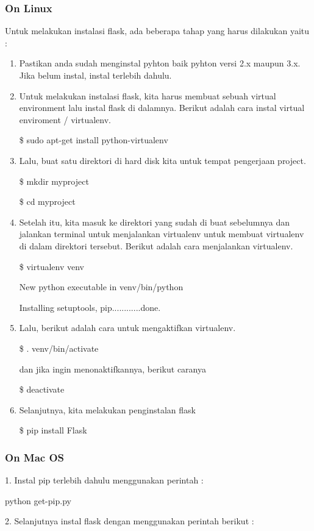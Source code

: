 \documentclass[12pt,a4paper]{article}
\begin{document}
\subsubsection{On Linux}
Untuk melakukan instalasi flask, ada beberapa tahap yang harus dilakukan yaitu :
\begin{enumerate}
\item Pastikan anda sudah menginstal pyhton baik pyhton versi 2.x maupun 3.x. Jika belum instal, instal terlebih dahulu.

\item Untuk melakukan instalasi flask, kita harus membuat sebuah virtual environment lalu instal flask di dalamnya. Berikut adalah cara instal virtual enviroment / virtualenv.

\$ sudo apt-get install python-virtualenv

\item Lalu, buat satu direktori di hard disk kita untuk tempat pengerjaan project. 

\$ mkdir myproject

\$ cd myproject

\item Setelah itu, kita masuk ke direktori yang sudah di buat sebelumnya dan jalankan terminal untuk menjalankan virtualenv untuk membuat virtualenv di dalam direktori tersebut. Berikut adalah cara menjalankan virtualenv.

\$ virtualenv venv

New python executable in venv/bin/python

Installing setuptools, pip............done.

\item Lalu, berikut adalah cara untuk mengaktifkan virtualenv.

\$ . venv/bin/activate 

dan jika ingin menonaktifkannya, berikut caranya 

\$ deactivate

\item Selanjutnya, kita melakukan penginstalan flask

\$ pip install Flask
\end{enumerate}
\subsubsection{On Mac OS}
1. Instal pip terlebih dahulu menggunakan perintah :

	python get-pip.py

2. Selanjutnya instal flask dengan menggunakan perintah berikut :
\end{document}
